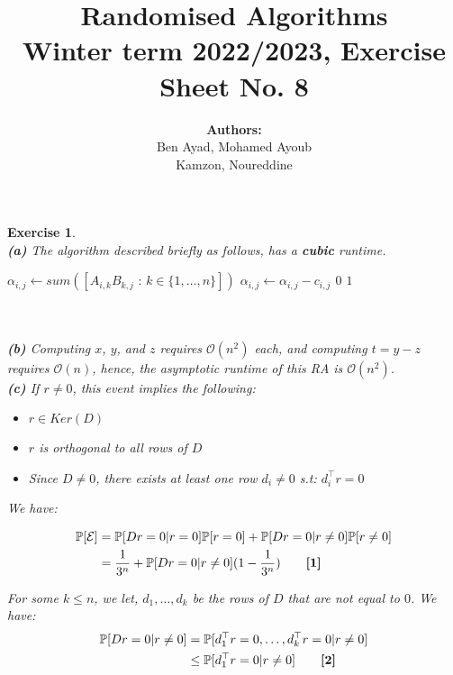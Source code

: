 \documentclass{article}
\title{Randomised Algorithms \\
Winter term 2022/2023, Exercise Sheet No. 8}
\author{
    \textbf{Authors:} \\
    Ben Ayad, Mohamed Ayoub \\
    Kamzon, Noureddine
}
\newtheorem{exo}{Exercise}
\def\P{\mathbb{P}}
\begin{document}
\maketitle

\begin{exo}{\ \\}
\noindent
\textbf{(a)}  The algorithm described briefly as follows, has a \textbf{cubic} runtime.

\begin{algorithmic}[1]
    \State $\alpha_{i,j} \gets sum([A_{i,k}B_{k,j} \text{ : } k \in \{1,\dots ,n\}])$ 
    \State $\alpha_{i,j} \gets \alpha_{i,j} - c_{i,j}$
    \State \Return $0$
\EndIf
\EndFor 
\State \Return $1$
\end{algorithmic} \\

\noindent
\\\textbf{(b)}  Computing $x$, $y$, and $z$ requires $\mathcal{O}(n^2)$ each, and computing $t = y-z$ requires $\mathcal{O}(n)$, hence, the asymptotic runtime of this RA is $\mathcal{O}(n^2)$.\\

\noindent
\textbf{(c)} If $r \neq 0$, this event implies the following:
\begin{itemize}
    \item $r \in Ker(D)$
    \item $r$ is orthogonal to all rows of $D$
    \item Since $D \neq 0$, there exists at least one row $d_i \neq 0$ s.t: $d_i^\top r = 0$
\end{itemize}

We have:

\begin{align*}
    \P[\mathcal{E}] 
    &= \P[Dr=0|r=0]\P[r=0] + \P[Dr=0|r\neq0]\P[r\neq0] \\
    &= \frac{1}{3^n} + \P[Dr=0|r\neq0](1-\frac{1}{3^n}) \quad \quad  \text{\textbf{[1]}}
\end{align*}


For some $k\leq n$, we let, $d_1, \dots, d_k$  be the rows of $D$ that are not equal to $0$. We have:
\begin{align*}
    \P[Dr=0|r\neq0]
    &= \P[d_1^\top r = 0, \dots, d_k^\top r = 0 |  r\neq0] \\
    &\leq \P[d_1^\top r = 0 | r\neq0]    \quad \quad  \text{\textbf{[2]}}
\end{align*}


\end{exo}
\end{document}
